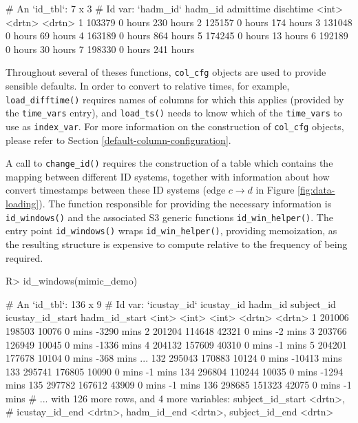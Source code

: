\documentclass[
  notitle]{jss}
\begin{document}
\begin{CodeChunk}
\begin{CodeOutput}
# An `id_tbl`: 7 x 3
# Id var:      `hadm_id`
  hadm_id admittime dischtime
    <int> <drtn>    <drtn>
1  103379 0 hours   230 hours
2  125157 0 hours   174 hours
3  131048 0 hours    69 hours
4  163189 0 hours   864 hours
5  174245 0 hours    13 hours
6  192189 0 hours    30 hours
7  198330 0 hours   241 hours
\end{CodeOutput}
\end{CodeChunk}

Throughout several of theses functions, \texttt{col\_cfg} objects are
used to provide sensible defaults. In order to convert to relative
times, for example, \texttt{load\_difftime()} requires names of columns
for which this applies (provided by the \texttt{time\_vars} entry), and
\texttt{load\_ts()} needs to know which of the \texttt{time\_vars} to
use as \texttt{index\_var}. For more information on the construction of
\texttt{col\_cfg} objects, please refer to Section
\ref{default-column-configuration}.

A call to \texttt{change\_id()} requires the construction of a table
which contains the mapping between different ID systems, together with
information about how convert timestamps between these ID systems (edge
\(c \to d\) in Figure \ref{fig:data-loading}). The function responsible
for providing the necessary information is \texttt{id\_windows()} and
the associated S3 generic functions \texttt{id\_win\_helper()}. The
entry point \texttt{id\_windows()} wraps \texttt{id\_win\_helper()},
providing memoization, as the resulting structure is expensive to
compute relative to the frequency of being required.

\begin{CodeChunk}
\begin{CodeInput}
R> id_windows(mimic_demo)
\end{CodeInput}
\begin{CodeOutput}
# An `id_tbl`: 136 x 9
# Id var:      `icustay_id`
    icustay_id hadm_id subject_id icustay_id_start hadm_id_start
         <int>   <int>      <int> <drtn>           <drtn>
  1     201006  198503      10076 0 mins            -3290 mins
  2     201204  114648      42321 0 mins               -2 mins
  3     203766  126949      10045 0 mins            -1336 mins
  4     204132  157609      40310 0 mins               -1 mins
  5     204201  177678      10104 0 mins             -368 mins
...
132     295043  170883      10124 0 mins           -10413 mins
133     295741  176805      10090 0 mins               -1 mins
134     296804  110244      10035 0 mins            -1294 mins
135     297782  167612      43909 0 mins               -1 mins
136     298685  151323      42075 0 mins               -1 mins
# ... with 126 more rows, and 4 more variables: subject_id_start <drtn>,
#   icustay_id_end <drtn>, hadm_id_end <drtn>, subject_id_end <drtn>
\end{CodeOutput}
\end{CodeChunk}
\end{document}
